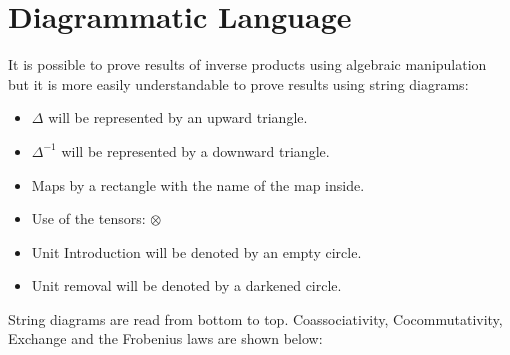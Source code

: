 \documentclass[11pt, oneside]{amsart}
\theoremstyle{definition}
\theoremstyle{definition}
\begin{document}
\section{Diagrammatic Language}
It is possible to prove results of inverse products using algebraic manipulation but it is more easily understandable to prove results using string diagrams:
\begin{itemize}
    \item $\Delta$ will be represented by an upward triangle.
    \item $\Delta^{-1}$ will be represented by a downward triangle.
    \item Maps by a rectangle with the name  of the map inside.
    \item Use of the tensors: $\otimes$
    \item Unit Introduction will be denoted by an empty circle.
    \item Unit removal will be denoted by a darkened circle.
\end{itemize}
String diagrams are read from bottom to top. Coassociativity, Cocommutativity, Exchange and the Frobenius laws are shown below:
\end{document}
